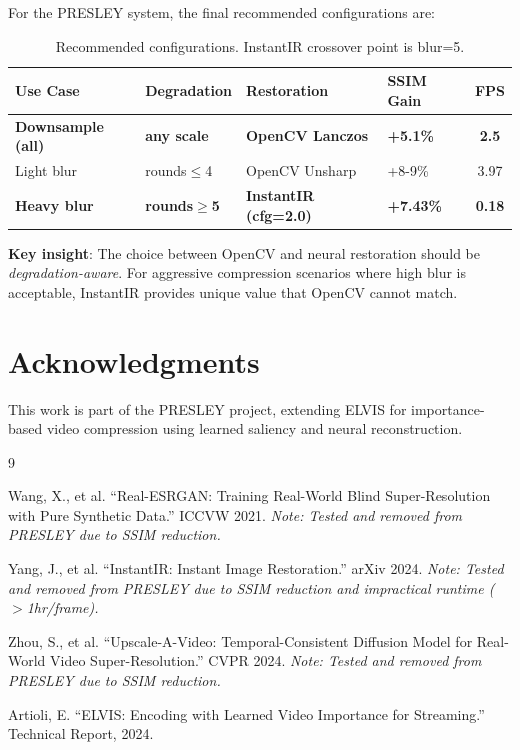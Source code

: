 \documentclass[11pt,a4paper]{article}
\begin{document}
For the PRESLEY system, the final recommended configurations are:

\begin{table}[h]
\centering
\begin{tabular}{llllc}
\toprule
\textbf{Use Case} & \textbf{Degradation} & \textbf{Restoration} & \textbf{SSIM Gain} & \textbf{FPS} \\
\midrule
\textbf{Downsample (all)} & \textbf{any scale} & \textbf{OpenCV Lanczos} & \textbf{+5.1\%} & \textbf{2.5} \\
Light blur & rounds$\leq$4 & OpenCV Unsharp & +8-9\% & 3.97 \\
\textbf{Heavy blur} & \textbf{rounds$\geq$5} & \textbf{InstantIR (cfg=2.0)} & \textbf{+7.43\%} & \textbf{0.18} \\
\bottomrule
\end{tabular}
\caption{Recommended configurations. InstantIR crossover point is blur=5.}
\end{table}

\textbf{Key insight}: The choice between OpenCV and neural restoration should be \emph{degradation-aware}. For aggressive compression scenarios where high blur is acceptable, InstantIR provides unique value that OpenCV cannot match.

\section*{Acknowledgments}

This work is part of the PRESLEY project, extending ELVIS for importance-based video compression using learned saliency and neural reconstruction.


\begin{thebibliography}{9}

Wang, X., et al. ``Real-ESRGAN: Training Real-World Blind Super-Resolution with Pure Synthetic Data.'' ICCVW 2021. \textit{Note: Tested and removed from PRESLEY due to SSIM reduction.}

Yang, J., et al. ``InstantIR: Instant Image Restoration.'' arXiv 2024. \textit{Note: Tested and removed from PRESLEY due to SSIM reduction and impractical runtime ($>$1hr/frame).}

Zhou, S., et al. ``Upscale-A-Video: Temporal-Consistent Diffusion Model for Real-World Video Super-Resolution.'' CVPR 2024. \textit{Note: Tested and removed from PRESLEY due to SSIM reduction.}

Artioli, E. ``ELVIS: Encoding with Learned Video Importance for Streaming.'' Technical Report, 2024.

\end{thebibliography}
\end{document}
